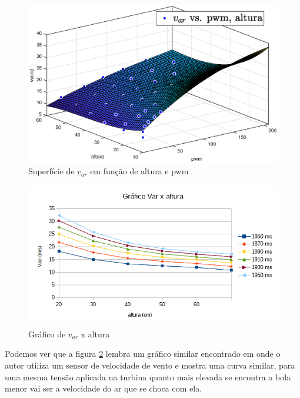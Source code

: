 \begin{figure}[htb]
	\centering
	\includegraphics[width=1\linewidth]{pasta1_figuras/curvavar}
	\caption[Superfície de $v_{ar}$ em função de altura e pwm]{Superfície de $v_{ar}$ em função de altura e pwm}
	\label{fig:curvavar}
\end{figure}


\begin{figure}[htb]
	\centering
	\includegraphics[width=1\linewidth]{grafico_vair_altura}
	\caption[Gráfico $v_{ar}$ x altura]{Gráfico de $v_{ar}$ x altura}
	\label{fig:graficovairaltura1}
\end{figure}

Podemos ver que a figura \ref{fig:graficovairaltura1} lembra um gráfico similar encontrado em \cite{jernigan2009} onde o autor utiliza um sensor de velocidade de vento e mostra uma curva similar, para uma mesma tensão aplicada na turbina quanto mais elevada se encontra a bola menor vai ser a velocidade do ar que se choca com ela.

